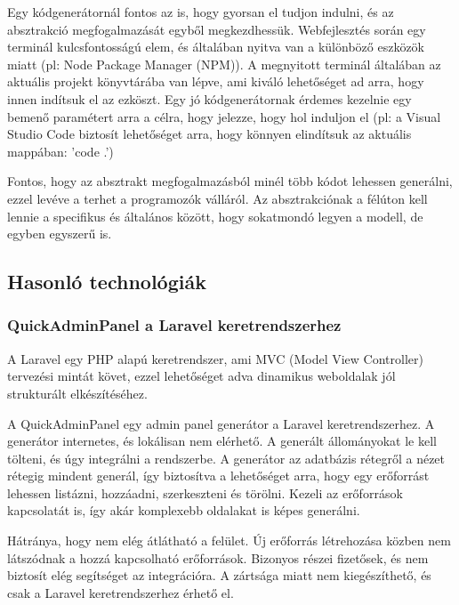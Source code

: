 \documentclass[a4paper,12pt,oneside]{report}
\begin{document}
\begin{justify}
	Egy kódgenerátornál fontos az is, hogy gyorsan el tudjon indulni, és az absztrakció megfogalmazását egyből megkezdhessük. Webfejlesztés során egy terminál kulcsfontosságú elem, és általában nyitva van a különböző eszközök miatt (pl: Node Package Manager (NPM)). A megnyitott terminál általában az aktuális projekt könyvtárába van lépve, ami kiváló lehetőséget ad arra, hogy innen indítsuk el az ezköszt. Egy jó kódgenerátornak érdemes kezelnie egy bemenő paramétert arra a célra, hogy jelezze, hogy hol induljon el (pl: a Visual Studio Code biztosít lehetőséget arra, hogy könnyen elindítsuk az aktuális mappában: 'code .') 

	Fontos, hogy az absztrakt megfogalmazásból minél több kódot lehessen generálni, ezzel levéve a terhet a programozók válláról. Az absztrakciónak a félúton kell lennie a specifikus és általános között, hogy sokatmondó legyen a modell, de egyben egyszerű is.


\end{justify}

\newpage
\subsection{Hasonló technológiák}
\subsubsection{QuickAdminPanel a Laravel keretrendszerhez}

\begin{justify}

	A Laravel egy PHP alapú keretrendszer, ami MVC (Model View Controller) tervezési mintát követ, ezzel lehetőséget adva dinamikus weboldalak jól strukturált elkészítéséhez. 

	A QuickAdminPanel egy admin panel generátor a Laravel keretrendszerhez. A generátor internetes, és lokálisan nem elérhető. A generált állományokat le kell tölteni, és úgy integrálni a rendszerbe. A generátor az adatbázis rétegről a nézet rétegig mindent generál, így biztosítva a lehetőséget arra, hogy egy erőforrást lehessen listázni, hozzáadni, szerkeszteni és törölni. Kezeli az erőforrások kapcsolatát is, így akár komplexebb oldalakat is képes generálni.

	Hátránya, hogy nem elég átlátható a felület. Új erőforrás létrehozása közben nem látszódnak a hozzá kapcsolható erőforrások. Bizonyos részei fizetősek, és nem biztosít elég segítséget az integrációra. A zártsága miatt nem kiegészíthető, és csak a Laravel keretrendszerhez érhető el.

\end{justify}
\end{document}
